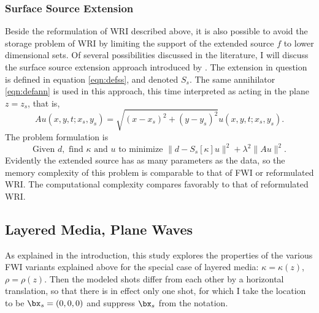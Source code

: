 \subsubsection{Surface Source Extension}
Beside the reformulation of WRI described above, it is also possible
to avoid the storage problem of WRI by limiting the support of the
extended source $f$ to lower dimensional sets. Of several
possibilities discussed in the literature, I will discuss the 
  surface source extension approach introduced by
\cite{HuangNammourSymesDollizal:SEG19}. The extension in question is
defined in equation \ref{eqn:defss}, and denoted $S_s$. The same
annihilator \ref{eqn:defann} is used in this approach, this time
interpreted as acting in the plane $z=z_s$, that is,
\[
  Au(x,y,t;x_s,y_s) = \sqrt{(x-x_s)^2+(y-y_s)^2}u(x,y,t;x_s,y_s).
\]
The problem formulation is
\begin{equation}
  \label{eqn:defsse}
  \mbox{Given } d, \mbox{ find }\kappa \mbox{ and }u \mbox{ to
    minimize }
  \| d -  S_s[\kappa]u\|^2+\lambda^2\|Au\|^2.
\end{equation}
Evidently the extended source has as many parameters as the data, so
the memory complexity of this problem is comparable to that of FWI or
reformulated WRI. The computational complexity compares favorably to
that of reformulated WRI.

\subsection{Layered Media, Plane Waves}
As explained in the introduction, this study explores the properties
of the various FWI variants explained above for the special case of
layered media: $\kappa = \kappa(z)$,
$\rho=\rho(z)$. Then the modeled shots differ from
each other by a horizontal translation, so that there is in effect
only one shot, for which I take the location to be
$\bx_s=(0,0,0)$ and suppress $\bx_s$ from the notation.

